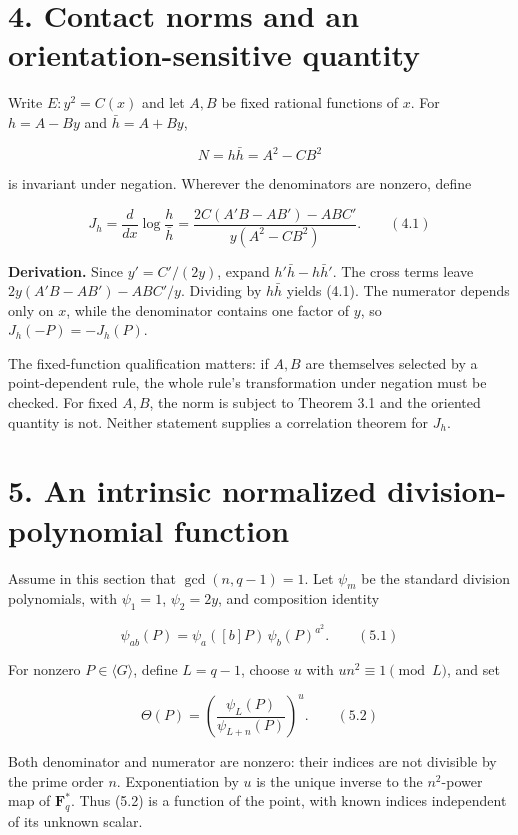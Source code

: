 \documentclass[
  11pt,
  a4paper,
]{article}
\begin{document}
\section{4. Contact norms and an orientation-sensitive
quantity}\label{contact-norms-and-an-orientation-sensitive-quantity}

Write \(E:y^2=C(x)\) and let \(A,B\) be fixed rational functions of
\(x\). For \(h=A-By\) and \(\bar h=A+By\),

\[
N=h\bar h=A^2-CB^2
\]

is invariant under negation. Wherever the denominators are nonzero,
define

\[
J_h=\frac{d}{dx}\log\frac{h}{\bar h}
=\frac{2C(A'B-AB')-ABC'}{y(A^2-CB^2)}. \qquad (4.1)
\]

\textbf{Derivation.} Since \(y'=C'/(2y)\), expand \(h'\bar h-h\bar h'\).
The cross terms leave \(2y(A'B-AB')-ABC'/y\). Dividing by \(h\bar h\)
yields (4.1). The numerator depends only on \(x\), while the denominator
contains one factor of \(y\), so \(J_h(-P)=-J_h(P)\).

The fixed-function qualification matters: if \(A,B\) are themselves
selected by a point-dependent rule, the whole rule's transformation
under negation must be checked. For fixed \(A,B\), the norm is subject
to Theorem 3.1 and the oriented quantity is not. Neither statement
supplies a correlation theorem for \(J_h\).

\section{5. An intrinsic normalized division-polynomial
function}\label{an-intrinsic-normalized-division-polynomial-function}

Assume in this section that \(\gcd(n,q-1)=1\). Let \(\psi_m\) be the
standard division polynomials, with \(\psi_1=1\), \(\psi_2=2y\), and
composition identity

\[
\psi_{ab}(P)=\psi_a([b]P)\,\psi_b(P)^{a^2}. \qquad (5.1)
\]

For nonzero \(P\in\langle G\rangle\), define \(L=q-1\), choose \(u\)
with \(u n^2\equiv1\pmod L\), and set

\[
\Theta(P)=\left(\frac{\psi_L(P)}{\psi_{L+n}(P)}\right)^u. \qquad (5.2)
\]

Both denominator and numerator are nonzero: their indices are not
divisible by the prime order \(n\). Exponentiation by \(u\) is the
unique inverse to the \(n^2\)-power map of \(\mathbf F_q^*\). Thus (5.2)
is a function of the point, with known indices independent of its
unknown scalar.
\end{document}
